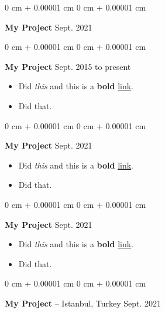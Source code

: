 \documentclass[10pt, letterpaper]{article}
\newenvironment{highlights}{
    \begin{itemize}[
        topsep=0.10 cm,
        parsep=0.10 cm,
        partopsep=0pt,
        itemsep=0pt,
        leftmargin=0 cm + 10pt
    ]
}{
    \end{itemize}
        
    \vspace{-0.20cm}
} %
\newenvironment{onecolentry}{
    \begin{adjustwidth}{
        0 cm + 0.00001 cm
    }{
        0 cm + 0.00001 cm
    }
}{
    \end{adjustwidth}
} %
\begin{document}
        \vspace{0.1 cm}

        \begin{onecolentry}
            \textbf{My Project} \hfill Sept. 2021
        \end{onecolentry}

        \vspace{0.1 cm}

        \begin{onecolentry}
            \textbf{My Project} \hfill Sept. 2015 to present
            \begin{highlights}
                \item Did \textit{this} and this is a \textbf{bold} \href{https://example.com}{link}.
                \item Did that.
            \end{highlights}
        \end{onecolentry}

        \vspace{0.1 cm}

        \begin{onecolentry}
            \textbf{My Project} \hfill Sept. 2021
            \begin{highlights}
                \item Did \textit{this} and this is a \textbf{bold} \href{https://example.com}{link}.
                \item Did that.
            \end{highlights}
        \end{onecolentry}

        \vspace{0.1 cm}

        \begin{onecolentry}
            \textbf{My Project} \hfill Sept. 2021
            \begin{highlights}
                \item Did \textit{this} and this is a \textbf{bold} \href{https://example.com}{link}.
                \item Did that.
            \end{highlights}
        \end{onecolentry}

        \vspace{0.1 cm}

        \begin{onecolentry}
            \textbf{My Project} -- Istanbul, Turkey \hfill Sept. 2021
        \end{onecolentry}
\end{document}
